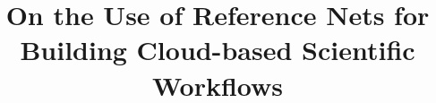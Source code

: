 \documentclass[a4paper,fleqn]{cas-sc}
\begin{document}
\let\WriteBookmarks\relax
\def\floatpagepagefraction{1}
\def\textpagefraction{.001}


\title [mode = title]{On the Use of Reference Nets for Building Cloud-based Scientific Workflows}  



%










\end{document}
